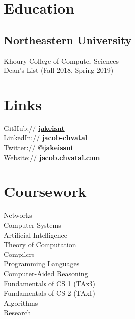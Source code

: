 \documentclass[letterpaper]{cv} %
\begin{document}
\begin{minipage}[t]{0.33\textwidth} %

  \section{Education}
  \subsection{Northeastern University}
  Khoury College of Computer Sciences \\
  Dean's List (Fall 2018, Spring 2019) \\
  \sectionspace %

  \section{Links}
  GitHub:// \href{https://github.com/jakeisnt}{\bf jakeisnt} \\
  LinkedIn:// \href{https://www.linkedin.com/in/jacob-chvatal}{\bf jacob-chvatal} \\
  Twitter:// \href{https://twitter.com/jakeissnt}{\bf @jakeissnt} \\
  Website:// \href{https://wiki.chvatal.com}{\bf jacob.chvatal.com} \\
  \sectionspace

  \section{Coursework}
  Networks \\
  Computer Systems \\
  Artificial Intelligence \\
  Theory of Computation \\
  Compilers \\
  Programming Languages \\
  Computer-Aided Reasoning \\
  Fundamentals of CS 1 (TAx3) \\
  Fundamentals of CS 2 (TAx1) \\
  Algorithms \\
  Research


\end{minipage}
\end{document}
